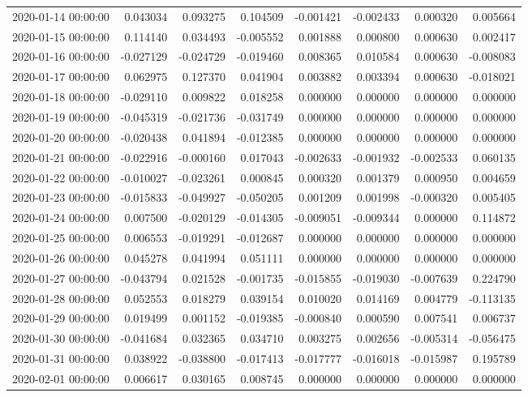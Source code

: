 \begin{tabular}{lrrrrrrr}
2020-01-14 00:00:00 & 0.043034 & 0.093275 & 0.104509 & -0.001421 & -0.002433 & 0.000320 & 0.005664 \\
2020-01-15 00:00:00 & 0.114140 & 0.034493 & -0.005552 & 0.001888 & 0.000800 & 0.000630 & 0.002417 \\
2020-01-16 00:00:00 & -0.027129 & -0.024729 & -0.019460 & 0.008365 & 0.010584 & 0.000630 & -0.008083 \\
2020-01-17 00:00:00 & 0.062975 & 0.127370 & 0.041904 & 0.003882 & 0.003394 & 0.000630 & -0.018021 \\
2020-01-18 00:00:00 & -0.029110 & 0.009822 & 0.018258 & 0.000000 & 0.000000 & 0.000000 & 0.000000 \\
2020-01-19 00:00:00 & -0.045319 & -0.021736 & -0.031749 & 0.000000 & 0.000000 & 0.000000 & 0.000000 \\
2020-01-20 00:00:00 & -0.020438 & 0.041894 & -0.012385 & 0.000000 & 0.000000 & 0.000000 & 0.000000 \\
2020-01-21 00:00:00 & -0.022916 & -0.000160 & 0.017043 & -0.002633 & -0.001932 & -0.002533 & 0.060135 \\
2020-01-22 00:00:00 & -0.010027 & -0.023261 & 0.000845 & 0.000320 & 0.001379 & 0.000950 & 0.004659 \\
2020-01-23 00:00:00 & -0.015833 & -0.049927 & -0.050205 & 0.001209 & 0.001998 & -0.000320 & 0.005405 \\
2020-01-24 00:00:00 & 0.007500 & -0.020129 & -0.014305 & -0.009051 & -0.009344 & 0.000000 & 0.114872 \\
2020-01-25 00:00:00 & 0.006553 & -0.019291 & -0.012687 & 0.000000 & 0.000000 & 0.000000 & 0.000000 \\
2020-01-26 00:00:00 & 0.045278 & 0.041994 & 0.051111 & 0.000000 & 0.000000 & 0.000000 & 0.000000 \\
2020-01-27 00:00:00 & -0.043794 & 0.021528 & -0.001735 & -0.015855 & -0.019030 & -0.007639 & 0.224790 \\
2020-01-28 00:00:00 & 0.052553 & 0.018279 & 0.039154 & 0.010020 & 0.014169 & 0.004779 & -0.113135 \\
2020-01-29 00:00:00 & 0.019499 & 0.001152 & -0.019385 & -0.000840 & 0.000590 & 0.007541 & 0.006737 \\
2020-01-30 00:00:00 & -0.041684 & 0.032365 & 0.034710 & 0.003275 & 0.002656 & -0.005314 & -0.056475 \\
2020-01-31 00:00:00 & 0.038922 & -0.038800 & -0.017413 & -0.017777 & -0.016018 & -0.015987 & 0.195789 \\
2020-02-01 00:00:00 & 0.006617 & 0.030165 & 0.008745 & 0.000000 & 0.000000 & 0.000000 & 0.000000 \\

\end{tabular}
